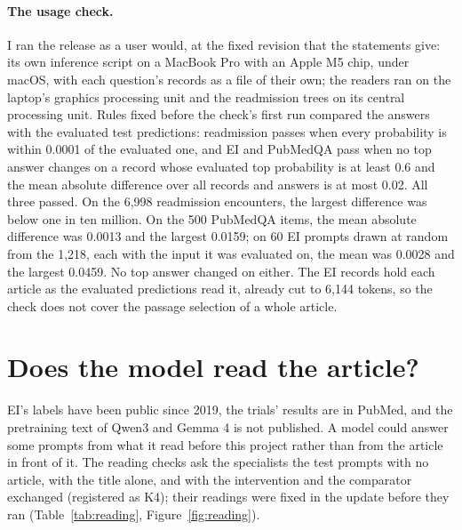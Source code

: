 \documentclass[11pt,letterpaper]{article}
\begin{document}
\paragraph{The usage check.} I ran the release as a user would, at the fixed revision that the statements give: its own inference script on a MacBook Pro with an Apple M5 chip, under macOS, with each question's records as a file of their own; the readers ran on the laptop's graphics processing unit and the readmission trees on its central processing unit. Rules fixed before the check's first run compared the answers with the evaluated test predictions: readmission passes when every probability is within 0.0001 of the evaluated one, and EI and PubMedQA pass when no top answer changes on a record whose evaluated top probability is at least 0.6 and the mean absolute difference over all records and answers is at most 0.02. All three passed. On the 6,998 readmission encounters, the largest difference was below one in ten million. On the 500 PubMedQA items, the mean absolute difference was 0.0013 and the largest 0.0159; on 60 EI prompts drawn at random from the 1,218, each with the input it was evaluated on, the mean was 0.0028 and the largest 0.0459. No top answer changed on either. The EI records hold each article as the evaluated predictions read it, already cut to 6,144 tokens, so the check does not cover the passage selection of a whole article.

\section{Does the model read the article?}
\label{sec:reading}

EI's labels have been public since 2019, the trials' results are in PubMed, and the pretraining text of Qwen3 and Gemma 4 is not published. A model could answer some prompts from what it read before this project rather than from the article in front of it. The reading checks ask the specialists the test prompts with no article, with the title alone, and with the intervention and the comparator exchanged (registered as K4); their readings were fixed in the update before they ran (Table~\ref{tab:reading}, Figure~\ref{fig:reading}).

\begin{table}[t]
\centering\footnotesize
\caption{The reading checks on Evidence Inference 2.0's test split (registered as K4, with readings fixed in advance). Each cell gives the estimate and its 95 percent interval from 1,000 article resamples. The title input leaves out the 9 prompts whose article gives no title (derived); the title's difference is computed on the prompts in both inputs. ``Direction answers'' are ``significantly increased'' and ``significantly decreased''; for them the exchanged prompt's expected answer is the other direction.}
\label{tab:reading}

\end{table}
\end{document}

